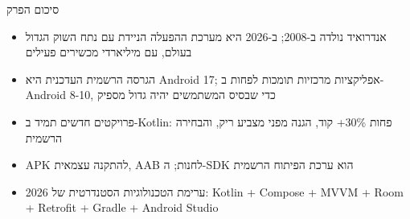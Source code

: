 \begin{tcbsummary}{סיכום הפרק}
\begin{itemize}
  \item אנדרואיד נולדה ב-2008; ב-2026 היא מערכת ההפעלה הניידת עם נתח השוק הגדול בעולם, עם מיליארדי מכשירים פעילים
  \item הגרסה הרשמית העדכנית היא Android 17; אפליקציות מרכזיות תומכות לפחות ב-Android 8-10, כדי שבסיס המשתמשים יהיה גדול מספיק
  \item פרויקטים חדשים תמיד ב-Kotlin: פחות 30\%+ קוד, הגנה מפני מצביע ריק, והבחירה הרשמית
  \item APK להתקנה עצמאית, AAB לחנות; ה-SDK הוא ערכת הפיתוח הרשמית
  \item ערימת הטכנולוגיות הסטנדרטית של 2026: Kotlin + Compose + MVVM + Room + Retrofit + Gradle + Android Studio
\end{itemize}

\end{tcbsummary}
